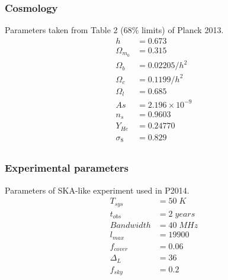 \documentclass[12pt]{article}
\numberwithin{equation}{section}
\begin{document}
\subsubsection{Cosmology}
Parameters taken from Table 2 (68\% limits) of Planck 2013. 
\begin{align*}
h &= 0.673\\
\Omega_{m_0} &= 0.315\\
\Omega_{b} &= 0.02205/h^2\\
\Omega_{c} &= 0.1199/h^2\\
\Omega_{l} &= 0.685\\
As &= 2.196\times 10^{-9}\\
n_s &= 0.9603\\
Y_{He} &= 0.24770\\
\sigma_8 &= 0.829\\
\end{align*}
%
%
%
%
%
%
%
%

\subsubsection{Experimental parameters}
Parameters of SKA-like experiment used in P2014. 
\begin{align*}
T_{sys} &= 50\;K\\
t_{obs} &= 2\; years\\
Bandwidth &= 40\;MHz \\
l_{max} &= 19900\\
f_{cover} &= 0.06\\
\Delta_L &= 36\\
f_{sky} &= 0.2\\
\end{align*}
\end{document}
